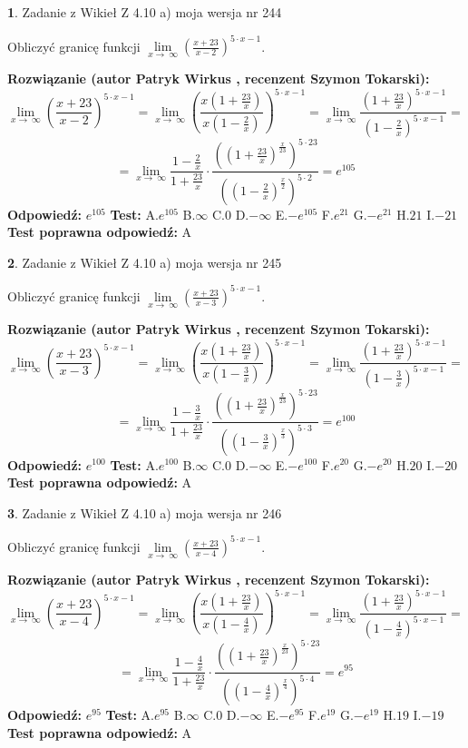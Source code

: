 \documentclass[12pt, a4paper]{article}
\theoremstyle{definition} %
\newtheorem{zad}{}
\newcommand{\zadStart}[1]{\begin{zad}#1\newline}
\newcommand{\zadStop}{\end{zad}}
\newcommand{\rozwStart}[2]{\noindent \textbf{Rozwiązanie (autor #1 , recenzent #2): }\newline}
\newcommand{\rozwStop}{\newline}
\newcommand{\odpStart}{\noindent \textbf{Odpowiedź:}\newline}
\newcommand{\odpStop}{\newline}
\newcommand{\testStart}{\noindent \textbf{Test:}\newline}
\newcommand{\testStop}{\newline}
\newcommand{\kluczStart}{\noindent \textbf{Test poprawna odpowiedź:}\newline}
\newcommand{\kluczStop}{\newline}
\begin{document}
\zadStart{Zadanie z Wikieł Z 4.10 a) moja wersja nr 244}

Obliczyć granicę funkcji  $\lim\limits_{x\to\ \infty}(\frac{x+23}{x-2})^{5\cdot x-1}$.
\zadStop
\rozwStart{Patryk Wirkus}{Szymon Tokarski}
$$\lim\limits_{x\to\ \infty}(\frac{x+23}{x-2})^{5\cdot x-1} = \lim\limits_{x\to\ \infty}(\frac{x(1+\frac{23}{x})}{x(1-\frac{2}{x})})^{5\cdot x-1}=\lim\limits_{x\to\ \infty}\frac{(1+\frac{23}{x})^{5\cdot x-1}}{(1-\frac{2}{x})^{5\cdot x-1}}=$$
$$=\lim\limits_{x\to\ \infty}\frac{1-\frac{2}{x}}{1+\frac{23}{x}}\cdot\frac{((1+\frac{23}{x})^{\frac{x}{23}})^{5\cdot23}}{((1-\frac{2}{x})^{\frac{x}{2}})^{5\cdot2}}=e^{105}$$
\rozwStop
\odpStart
$e^{105}$
\odpStop
\testStart
A.$e^{105}$ B.$\infty$ C.$0$ D.$-\infty$ E.$-e^{105}$
F.$e^{21}$ G.$-e^{21}$
H.$21$
I.$-21$
\testStop
\kluczStart
A
\kluczStop



\zadStart{Zadanie z Wikieł Z 4.10 a) moja wersja nr 245}

Obliczyć granicę funkcji  $\lim\limits_{x\to\ \infty}(\frac{x+23}{x-3})^{5\cdot x-1}$.
\zadStop
\rozwStart{Patryk Wirkus}{Szymon Tokarski}
$$\lim\limits_{x\to\ \infty}(\frac{x+23}{x-3})^{5\cdot x-1} = \lim\limits_{x\to\ \infty}(\frac{x(1+\frac{23}{x})}{x(1-\frac{3}{x})})^{5\cdot x-1}=\lim\limits_{x\to\ \infty}\frac{(1+\frac{23}{x})^{5\cdot x-1}}{(1-\frac{3}{x})^{5\cdot x-1}}=$$
$$=\lim\limits_{x\to\ \infty}\frac{1-\frac{3}{x}}{1+\frac{23}{x}}\cdot\frac{((1+\frac{23}{x})^{\frac{x}{23}})^{5\cdot23}}{((1-\frac{3}{x})^{\frac{x}{3}})^{5\cdot3}}=e^{100}$$
\rozwStop
\odpStart
$e^{100}$
\odpStop
\testStart
A.$e^{100}$ B.$\infty$ C.$0$ D.$-\infty$ E.$-e^{100}$
F.$e^{20}$ G.$-e^{20}$
H.$20$
I.$-20$
\testStop
\kluczStart
A
\kluczStop



\zadStart{Zadanie z Wikieł Z 4.10 a) moja wersja nr 246}

Obliczyć granicę funkcji  $\lim\limits_{x\to\ \infty}(\frac{x+23}{x-4})^{5\cdot x-1}$.
\zadStop
\rozwStart{Patryk Wirkus}{Szymon Tokarski}
$$\lim\limits_{x\to\ \infty}(\frac{x+23}{x-4})^{5\cdot x-1} = \lim\limits_{x\to\ \infty}(\frac{x(1+\frac{23}{x})}{x(1-\frac{4}{x})})^{5\cdot x-1}=\lim\limits_{x\to\ \infty}\frac{(1+\frac{23}{x})^{5\cdot x-1}}{(1-\frac{4}{x})^{5\cdot x-1}}=$$
$$=\lim\limits_{x\to\ \infty}\frac{1-\frac{4}{x}}{1+\frac{23}{x}}\cdot\frac{((1+\frac{23}{x})^{\frac{x}{23}})^{5\cdot23}}{((1-\frac{4}{x})^{\frac{x}{4}})^{5\cdot4}}=e^{95}$$
\rozwStop
\odpStart
$e^{95}$
\odpStop
\testStart
A.$e^{95}$ B.$\infty$ C.$0$ D.$-\infty$ E.$-e^{95}$
F.$e^{19}$ G.$-e^{19}$
H.$19$
I.$-19$
\testStop
\kluczStart
A
\kluczStop
\end{document}
